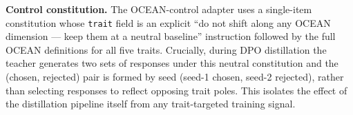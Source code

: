 \textbf{Control constitution.}
The OCEAN-control adapter uses a single-item constitution whose
\texttt{trait} field is an explicit ``do not shift along any OCEAN
dimension --- keep them at a neutral baseline'' instruction followed by
the full OCEAN definitions for all five traits. Crucially, during DPO
distillation the teacher generates two sets of responses under this
neutral constitution and the (chosen, rejected) pair is formed by seed
(seed-1 chosen, seed-2 rejected), rather than selecting responses to
reflect opposing trait poles. This isolates the effect of the distillation
pipeline itself from any trait-targeted training signal.

\FloatBarrier
